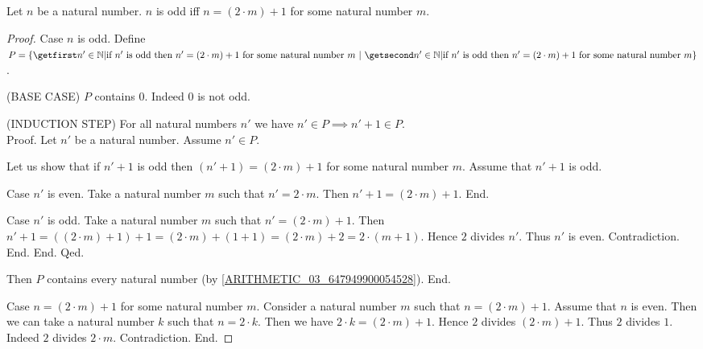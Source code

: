 \documentclass[10pt]{article}
\begin{document}
  \begin{forthel}
    \begin{proposition}
      Let $n$ be a natural number.
      $n$ is odd iff $n = (2 \cdot m) + 1$ for some natural number $m$.
    \end{proposition}
    \begin{proof}
      Case $n$ is odd.
        Define $P = \class{n' \in \Nat | \text{if $n'$ is odd then $n' = (2 \cdot m) + 1$ for some natural number $m$}}$.

        (BASE CASE) $P$ contains $0$.
        Indeed $0$ is not odd.

        (INDUCTION STEP) For all natural numbers $n'$ we have $n' \in P \implies n' + 1 \in P$. \\
        Proof.
          Let $n'$ be a natural number.
          Assume $n' \in P$.

          Let us show that if $n' + 1$ is odd then $(n' + 1) = (2 \cdot m) + 1$ for some natural number $m$.
            Assume that $n' + 1$ is odd.

            Case $n'$ is even.
              Take a natural number $m$ such that $n' = 2 \cdot m$.
              Then $n' + 1 = (2 \cdot m) + 1$.
            End.

            Case $n'$ is odd.
              Take a natural number $m$ such that $n' = (2 \cdot m) + 1$.
              Then $n' + 1 =
              ((2 \cdot m) + 1) + 1 =
              (2 \cdot m) + (1 + 1) =
              (2 \cdot m) + 2 =
              2 \cdot (m + 1)$.
              Hence $2$ divides $n'$.
              Thus $n'$ is even.
              Contradiction.
            End.
          End.
        Qed.

        Then $P$ contains every natural number (by \cref{ARITHMETIC_03_647949900054528}).
      End.

      Case $n = (2 \cdot m) + 1$ for some natural number $m$.
        Consider a natural number $m$ such that $n = (2 \cdot m) + 1$.
        Assume that $n$ is even.
        Then we can take a natural number $k$ such that $n = 2 \cdot k$.
        Then we have $2 \cdot k = (2 \cdot m) + 1$.
        Hence $2$ divides $(2 \cdot m) + 1$.
        Thus $2$ divides $1$.
        Indeed $2$ divides $2 \cdot m$.
        Contradiction.
      End.
    \end{proof}
  \end{forthel}
\end{document}
